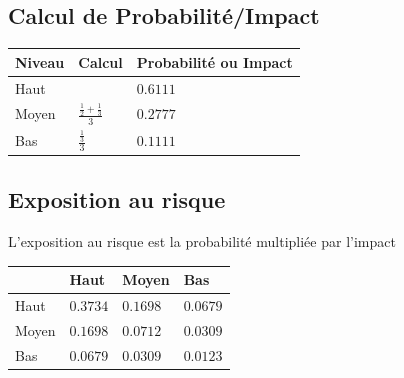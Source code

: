 \documentclass[11pt]{article}
\begin{document}
\begin{appendices}
\subsection{Calcul de Probabilité/Impact}

\begin{table}[H]
  \begin{center}
    \begin{tabu} to 0.5\linewidth {X[m]X[c,m]X[r,m]}
      Niveau & Calcul & Probabilité ou Impact \\
      \hline
      Haut  &  & $0.6111$\\
      Moyen & $\frac{\frac{1}{2} +\frac{1}{3}}{3}$                  & $0.2777$\\
      Bas   & $\frac{\frac{1}{3}}{3}$                               & $0.1111$\\
    \end{tabu}
  \end{center}
\end{table}

\subsection{Exposition au risque}
L'exposition au risque est la probabilité multipliée par l'impact

\begin{table}[H]
  \begin{center}
    \begin{tabu} to 0.7\linewidth {X[1]|X[1]|X[1]|X[1]}
              & Haut     & Moyen    & Bas \\
      \hline
      Haut    & $0.3734$ & $0.1698$ & $0.0679$\\
      \hline
      Moyen   & $0.1698$ & $0.0712$ & $0.0309$\\
      \hline
      Bas     & $0.0679$ & $0.0309$ & $0.0123$\\
    \end{tabu}
  \end{center}
\end{table}


\end{appendices}
\end{document}
